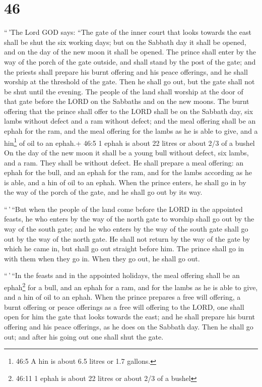 \hypertarget{section-44}{%
\section{46}\label{section-44}}

 ``\,'The Lord GOD says: ``The gate of the inner court that
looks towards the east shall be shut the six working days; but on the
Sabbath day it shall be opened, and on the day of the new moon it shall
be opened.  The prince shall enter by the way of the porch
of the gate outside, and shall stand by the post of the gate; and the
priests shall prepare his burnt offering and his peace offerings, and he
shall worship at the threshold of the gate. Then he shall go out, but
the gate shall not be shut until the evening.  The people of
the land shall worship at the door of that gate before the LORD on the
Sabbaths and on the new moons.  The burnt offering that the
prince shall offer to the LORD shall be on the Sabbath day, six lambs
without defect and a ram without defect;  and the meal
offering shall be an ephah for the ram, and the meal offering for the
lambs as he is able to give, and a hin\footnote{46:5 A hin is about 6.5
  litres or 1.7 gallons.} of oil to an ephah.+ 46:5 1 ephah is about 22
litres or about 2/3 of a bushel  On the day of the new moon
it shall be a young bull without defect, six lambs, and a ram. They
shall be without defect.  He shall prepare a meal offering:
an ephah for the bull, and an ephah for the ram, and for the lambs
according as he is able, and a hin of oil to an ephah.  When
the prince enters, he shall go in by the way of the porch of the gate,
and he shall go out by its way.

 ``\,'\,``But when the people of the land come before the
LORD in the appointed feasts, he who enters by the way of the north gate
to worship shall go out by the way of the south gate; and he who enters
by the way of the south gate shall go out by the way of the north gate.
He shall not return by the way of the gate by which he came in, but
shall go out straight before him.  The prince shall go in
with them when they go in. When they go out, he shall go out.

 ``\,'\,``In the feasts and in the appointed holidays, the
meal offering shall be an ephah\footnote{46:11 1 ephah is about 22
  litres or about 2/3 of a bushel} for a bull, and an ephah for a ram,
and for the lambs as he is able to give, and a hin of oil to an ephah.
 When the prince prepares a free will offering, a burnt
offering or peace offerings as a free will offering to the LORD, one
shall open for him the gate that looks towards the east; and he shall
prepare his burnt offering and his peace offerings, as he does on the
Sabbath day. Then he shall go out; and after his going out one shall
shut the gate.

